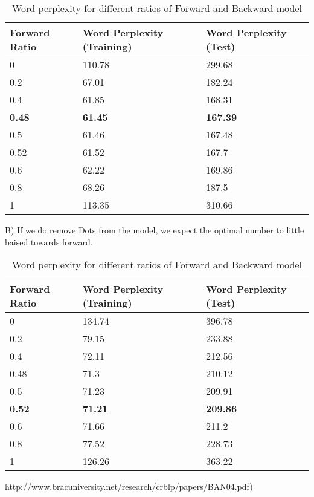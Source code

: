 \begin{center}	
    \begin{table}[ht]
    \centering
    \begin{tabular}{| l | l | l |}
    \hline
    Forward Ratio  &  Word Perplexity (Training) & Word Perplexity (Test)   \\ \hline
0 &	110.78 &	299.68 \\ \hline
0.2 & 	67.01 & 182.24  \\ \hline
0.4 & 	61.85 & 	168.31 \\ \hline
{\bfseries 0.48} & 	{\bfseries 61.45}	 & {\bfseries 167.39}\\ \hline
0.5	 & 61.46 & 	167.48 \\ \hline
0.52 & 	61.52 & 	167.7 \\ \hline
0.6 & 	62.22 & 	169.86 \\ \hline
0.8 & 	68.26 & 	187.5 \\ \hline
1 & 	113.35 & 	310.66 \\ \hline
    \end{tabular}
    \caption{Word perplexity for different ratios of Forward and Backward model}
    \end{table}%
\end{center}

B) If we do remove Dots from the model, we expect the optimal number to little baised towards forward. 

\begin{center}	
    \begin{table}[ht]
    \centering
    \begin{tabular}{| l | l | l |}
    \hline
    Forward Ratio  &  Word Perplexity (Training) & Word Perplexity (Test)   \\ \hline
0 &	134.74  & 396.78 \\ \hline
0.2	& 79.15 &	233.88 \\ \hline
0.4 & 72.11 &	212.56 \\ \hline
0.48	 & 71.3	 & 210.12 \\ \hline
0.5 & 71.23 &	209.91 \\ \hline
{\bfseries 0.52} & {\bfseries 71.21} & {\bfseries 209.86}\\ \hline
0.6	 & 71.66	 & 211.2\\ \hline
0.8 & 	77.52	 & 228.73\\ \hline
1	 & 126.26	 & 363.22\\ \hline
    \end{tabular}
    \caption{Word perplexity for different ratios of Forward and Backward model}
    \end{table}%
\end{center}

\begin{thebibliography}{100} %

 http://www.bracuniversity.net/research/crblp/papers/BAN04.pdf)

\end{thebibliography} 
